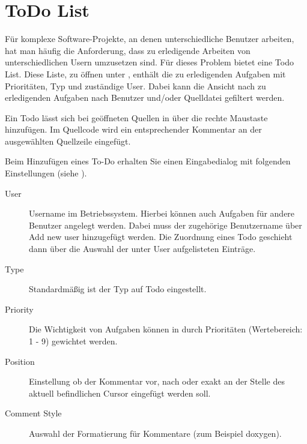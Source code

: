 \section{ToDo List}\label{sec:todo_list}

Für komplexe Software-Projekte, an denen unterschiedliche Benutzer arbeiten, hat man häufig die Anforderung, dass zu erledigende Arbeiten von unterschiedlichen Usern umzusetzen sind. Für dieses Problem bietet \codeblocks eine Todo List. Diese Liste, zu öffnen unter , enthält die zu erledigenden Aufgaben mit Prioritäten, Typ und zuständige User. Dabei kann die Ansicht nach zu erledigenden Aufgaben nach Benutzer und/oder Quelldatei gefiltert werden.



Ein Todo lässt sich bei geöffneten Quellen in \codeblocks über die rechte Maustaste  hinzufügen. Im Quellcode wird ein entsprechender Kommentar an der ausgewählten Quellzeile eingefügt.


Beim Hinzufügen eines To-Do erhalten Sie einen Eingabedialog mit folgenden Einstellungen (siehe ).


\begin{description}
\item[User] Username  im Betriebssystem. Hierbei können auch Aufgaben für andere Benutzer angelegt werden. Dabei muss der zugehörige Benutzername über Add new user hinzugefügt werden. Die Zuordnung eines Todo geschieht dann über die Auswahl der unter User aufgelisteten Einträge.

\item[Type] Standardmäßig ist der Typ auf Todo eingestellt.
\item[Priority] Die Wichtigkeit von Aufgaben können in \codeblocks durch Prioritäten (Wertebereich: 1 - 9) gewichtet werden.
\item[Position] Einstellung ob der Kommentar vor, nach oder exakt an der Stelle des aktuell befindlichen Cursor eingefügt werden soll.
\item[Comment Style] Auswahl der Formatierung für Kommentare (zum Beispiel doxygen).
\end{description}
